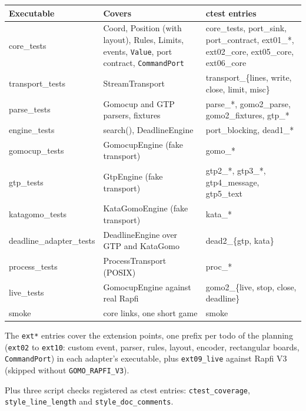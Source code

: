 \documentclass[11pt,a4paper]{article}
\newcommand{\code}[1]{\texttt{#1}}
\begin{document}
\begin{center}
\footnotesize
\begin{tabularx}{\textwidth}{@{}>{\ttfamily}l X >{\raggedright\arraybackslash\ttfamily}X@{}}
\toprule
\normalfont\textbf{Executable} & \textbf{Covers} & \normalfont\textbf{ctest entries} \\
\midrule
core\_tests     & Coord, Position (with layout), Rules, Limits, events, \code{Value}, port
                          contract, \code{CommandPort} &
                          core\_tests, port\_sink, port\_contract, ext01\_*, ext02\_core,
                          ext05\_core, ext06\_core \\
transport\_tests & StreamTransport & transport\_\{lines, write, close, limit, misc\} \\
parse\_tests    & Gomocup and GTP parsers, fixtures & parse\_*, gomo2\_parse, gomo2\_fixtures, gtp\_* \\
engine\_tests   & search(), DeadlineEngine & port\_blocking, dead1\_* \\
gomocup\_tests  & GomocupEngine (fake transport) & gomo\_* \\
gtp\_tests      & GtpEngine (fake transport) & gtp2\_*, gtp3\_*, gtp4\_message, gtp5\_text \\
katagomo\_tests & KataGomoEngine (fake transport) & kata\_* \\
deadline\_adapter\_tests & DeadlineEngine over GTP and KataGomo & dead2\_\{gtp, kata\} \\
process\_tests  & ProcessTransport (POSIX) & proc\_* \\
live\_tests     & GomocupEngine against real Rapfi & gomo2\_\{live, stop, close, deadline\} \\
smoke           & core links, one short game & smoke \\
\bottomrule
\end{tabularx}
\end{center}

\noindent The \code{ext*} entries cover the extension points, one prefix per todo of the planning
(\code{ext02} to \code{ext10}: custom event, parser, rules, layout, encoder, rectangular boards,
\code{CommandPort}) in each adapter's executable, plus \code{ext09\_live} against Rapfi V3 (skipped
without \code{GOMO\_RAPFI\_V3}).

\noindent Plus three script checks registered as ctest entries: \code{ctest\_coverage},
\code{style\_line\_length} and \code{style\_doc\_comments}.


\end{document}
